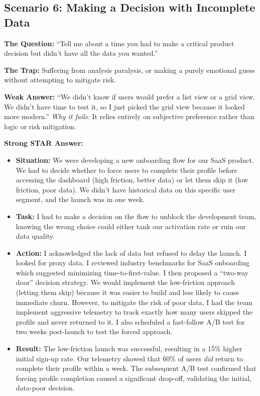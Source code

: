 \subsection{Scenario 6: Making a Decision with Incomplete
Data}\label{scenario-6-making-a-decision-with-incomplete-data}

\textbf{The Question:} ``Tell me about a time you had to make a critical
product decision but didn't have all the data you wanted.''

\textbf{The Trap:} Suffering from analysis paralysis, or making a purely
emotional guess without attempting to mitigate risk.

\textbf{Weak Answer:} ``We didn't know if users would prefer a list view
or a grid view. We didn't have time to test it, so I just picked the
grid view because it looked more modern.'' \emph{Why it fails:} It
relies entirely on subjective preference rather than logic or risk
mitigation.

\textbf{Strong STAR Answer:}

\begin{itemize}
\tightlist
\item
  \textbf{Situation:} We were developing a new onboarding flow for our
  SaaS product. We had to decide whether to force users to complete
  their profile before accessing the dashboard (high friction, better
  data) or let them skip it (low friction, poor data). We didn't have
  historical data on this specific user segment, and the launch was in
  one week.
\item
  \textbf{Task:} I had to make a decision on the flow to unblock the
  development team, knowing the wrong choice could either tank our
  activation rate or ruin our data quality.
\item
  \textbf{Action:} I acknowledged the lack of data but refused to delay
  the launch. I looked for proxy data. I reviewed industry benchmarks
  for SaaS onboarding which suggested minimizing time-to-first-value. I
  then proposed a ``two-way door'' decision strategy. We would implement
  the low-friction approach (letting them skip) because it was easier to
  build and less likely to cause immediate churn. However, to mitigate
  the risk of poor data, I had the team implement aggressive telemetry
  to track exactly how many users skipped the profile and never returned
  to it. I also scheduled a fast-follow A/B test for two weeks
  post-launch to test the forced approach.
\item
  \textbf{Result:} The low-friction launch was successful, resulting in
  a 15\% higher initial sign-up rate. Our telemetry showed that 60\% of
  users \emph{did} return to complete their profile within a week. The
  subsequent A/B test confirmed that forcing profile completion caused a
  significant drop-off, validating the initial, data-poor decision.
\end{itemize}

